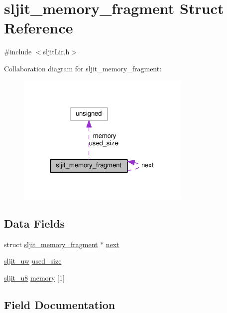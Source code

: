 \hypertarget{structsljit__memory__fragment}{}\section{sljit\+\_\+memory\+\_\+fragment Struct Reference}
\label{structsljit__memory__fragment}


{\ttfamily \#include $<$sljit\+Lir.\+h$>$}



Collaboration diagram for sljit\+\_\+memory\+\_\+fragment\+:
\nopagebreak
\begin{figure}[H]
\begin{center}
\leavevmode
\includegraphics[width=236pt]{structsljit__memory__fragment__coll__graph}
\end{center}
\end{figure}
\subsection*{Data Fields}
\begin{DoxyCompactItemize}
\item 
struct \hyperlink{structsljit__memory__fragment}{sljit\+\_\+memory\+\_\+fragment} $\ast$ \hyperlink{structsljit__memory__fragment_af58bda985c6e8f5ff1f8d293ccfcb03c}{next}
\item 
\hyperlink{sljitConfigInternal_8h_a4f2aa7461612a199a0e3fd93cd9a4d02}{sljit\+\_\+uw} \hyperlink{structsljit__memory__fragment_a237fe02fd449b7fb79786a9f5d2185d3}{used\+\_\+size}
\item 
\hyperlink{sljitConfigInternal_8h_a571cc542f404bfc97d5499bda583c5ee}{sljit\+\_\+u8} \hyperlink{structsljit__memory__fragment_a79350de8531fc96b9a3c9c741dc7da05}{memory} \mbox{[}1\mbox{]}
\end{DoxyCompactItemize}


\subsection{Field Documentation}
